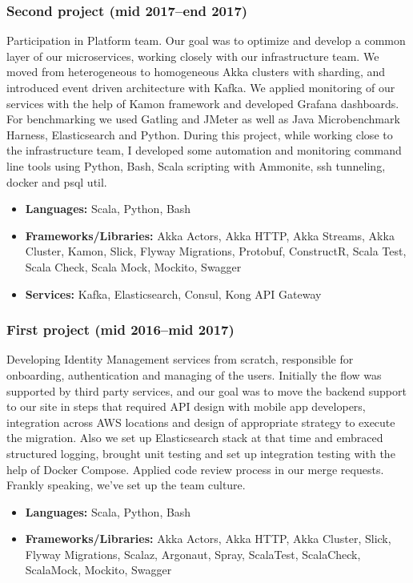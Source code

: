 \subsubsection*{Second project (mid 2017--end 2017)}

Participation in Platform team. Our goal was to optimize and develop a
common layer of our microservices, working closely with our
infrastructure team. We moved from heterogeneous to homogeneous Akka
clusters with sharding, and introduced event driven architecture with
Kafka. We applied monitoring of our services with the help of Kamon
framework and developed Grafana dashboards. For benchmarking we used
Gatling and JMeter as well as Java Microbenchmark Harness,
Elasticsearch and Python. During this project, while working close to
the infrastructure team, I developed some automation and monitoring
command line tools using Python, Bash, Scala scripting with Ammonite,
ssh tunneling, docker and psql util.

\begin{itemize}[noitemsep, nosep]
  \item \textbf{Languages:} Scala, Python, Bash
  \item \textbf{Frameworks/Libraries:} Akka Actors, Akka HTTP, Akka
Streams, Akka Cluster, Kamon, Slick, Flyway Migrations, Protobuf,
ConstructR, Scala Test, Scala Check, Scala Mock, Mockito, Swagger
  \item \textbf{Services:} Kafka, Elasticsearch, Consul, Kong API
Gateway
\end{itemize}

\subsubsection*{First project (mid 2016--mid 2017)}

Developing Identity Management services from scratch, responsible for
onboarding, authentication and managing of the users. Initially the
flow was supported by third party services, and our goal was to move
the backend support to our site in steps that required API design with
mobile app developers, integration across AWS locations and design of
appropriate strategy to execute the migration. Also we set up
Elasticsearch stack at that time and embraced structured logging,
brought unit testing and set up integration testing with the help of
Docker Compose.  Applied code review process in our merge
requests. Frankly speaking, we've set up the team culture.

\begin{itemize}[noitemsep, nosep]
  \item \textbf{Languages:} Scala, Python, Bash
  \item \textbf{Frameworks/Libraries:} Akka Actors, Akka HTTP, Akka
Cluster, Slick, Flyway Migrations, Scalaz, Argonaut, Spray, ScalaTest,
ScalaCheck, ScalaMock, Mockito, Swagger
\end{itemize}
